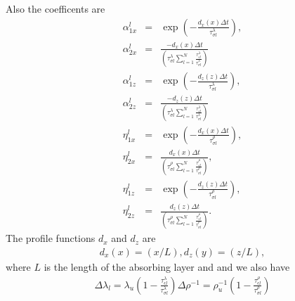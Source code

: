 \documentclass[11pt]{article}
\begin{document}
Also the coefficents are
\begin{eqnarray*}
\alpha^l_{1x}  & = & \exp\left(-\frac{d_x(x)\Delta t}
                          {\tau^{\lambda}_{\sigma l}}\right),        \\
\alpha^l_{2x}  & = & \frac{-d_x(x)\Delta t}
                  {(\tau^{\lambda}_{\sigma l}
                   \sum_{l=1}^N \frac{\tau^{\lambda}_{\epsilon l}}
                                     {\tau^{\lambda}_{\sigma l}  })
                  }                                                  \\
\alpha^l_{1z}  & = & \exp\left(-\frac{d_z(z)\Delta t}
                          {\tau^{\lambda}_{\sigma l}}\right),        \\
\alpha^l_{2z}  & = & \frac{-d_z(z)\Delta t}
                  {(\tau^{\lambda}_{\sigma l}
                   \sum_{l=1}^N \frac{\tau^{\lambda}_{\epsilon l}}
                                     {\tau^{\lambda}_{\sigma l}  })
                  }                                                  \\
\eta^l_{1x}  & = & \exp\left(-\frac{d_x(x)\Delta t}
                          {\tau^{\rho}_{\sigma l}}\right),           \\
\eta^l_{2x}  & = & \frac{d_x(x)\Delta t}
                  {(\tau^{\rho}_{\sigma l}
                   \sum_{l=1}^N \frac{\tau^{\rho}_{\epsilon l}}
                                     {\tau^{\rho}_{\sigma l}  })
                  },                                                 \\
\eta^l_{1z}  & = & \exp\left(-\frac{d_z(z)\Delta t}
                          {\tau^{\rho}_{\sigma l}}\right),           \\
\eta^l_{2z}  & = & \frac{d_z(z)\Delta t}
                  {(\tau^{\rho}_{\sigma l}
                   \sum_{l=1}^N \frac{\tau^{\rho}_{\epsilon l}}
                                     {\tau^{\rho}_{\sigma l}  })
                  }.
\end{eqnarray*}
The profile functions $d_x$ and $d_z$ are
\begin{eqnarray*}
  d_x(x) = (x/L),
  d_z(y) = (z/L),
\end{eqnarray*}
where $L$ is the length of the absorbing layer and 
and we also have
\begin{eqnarray}
\Delta \lambda_l = \lambda_u\left(1-\frac{\tau^{\lambda}_{\epsilon l}}{\tau^{\lambda}_{\sigma l}}\right)
\Delta \rho^{-1} = \rho^{-1}_u\left(1-\frac{\tau^{\rho}_{\epsilon l}}{\tau^{\rho}_{\sigma l}}\right)
\end{eqnarray}
\end{document}
